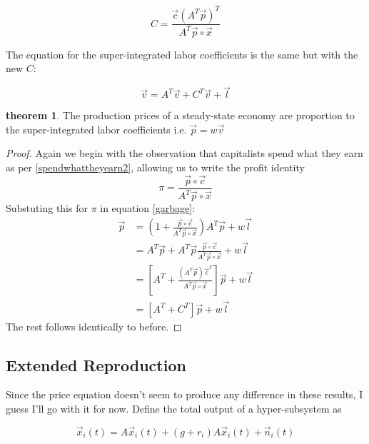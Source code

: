 \documentclass{article}
\theoremstyle{definition}
\newtheorem{theorem}{theorem}[section]
\begin{document}
\begin{equation}
    C = \frac{\vec{c}(A^T\vec{p})^T}{A^T\vec{p}\circ \vec{x}}
\end{equation}

The equation for the super-integrated labor coefficients is the same but with the new $C$:

\begin{equation}
    \vec{v} = A^T\vec{v}+C^T\vec{v}+\vec{l}
\end{equation}

\begin{theorem}
    The production prices of a steady-state economy are proportion to the super-integrated labor coefficients i.e. $\vec{p} = w\vec{v}$
\end{theorem}

\begin{proof}
    Again we begin with the observation that capitalists spend what they earn as per \ref{spendwhattheyearn2}, allowing us to write the profit identity
    \begin{equation}
        \pi = \frac{\vec{p}\circ \vec{c}}{A^T\vec{p}\circ \vec{x}}
    \end{equation}
    Substuting this for $\pi$ in equation \ref{garbage}:
    \begin{align}
        \vec{p} &= (1+\frac{\vec{p}\circ \vec{c}}{A^T\vec{p}\circ \vec{x}}
)A^T\vec{p}+w\vec{l} \\
                &= A^T\vec{p}+ A^T\vec{p}\frac{\vec{p}\circ \vec{c}}{A^T\vec{p}\circ \vec{x}}+w\vec{l} \\
                &= \left[A^T + \frac{(A^T\vec{p})\vec{c}^T}{A^T\vec{p}\circ \vec{x}} \right]\vec{p} + w\vec{l} \\
                &= [A^T+C^T]\vec{p} + w\vec{l}
    \end{align}
    The rest follows identically to before. 
\end{proof}

\subsection{Extended Reproduction}

Since the price equation doesn't seem to produce any difference in these results, I guess I'll go with it for now. Define the total output of a hyper-subsystem as 

\begin{equation}
    \vec{x}_i(t) = A\vec{x}_i(t) + (g+r_i)A\vec{x}_i(t) + \vec{n}_i(t)
\end{equation}
\end{document}

